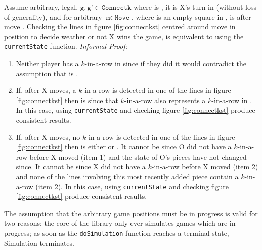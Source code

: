 Assume arbitrary, legal, $\texttt{g},\texttt{g'}\in\texttt{Connectk}$ where  is , it is X's turn in  (without loss of generality), and for arbitrary $\texttt{m}\in\texttt{Move}$, where  is an empty square in ,  is  after move . Checking the lines in figure \ref{fig:connectkst} centred around move  in position  to decide weather or not X wins the game, is equivalent to using the \texttt{currentState} function. \textit{Informal Proof:}
\begin{enumerate}
\item Neither player has a $k$-in-a-row in  since if they did it would contradict the assumption that  is .
\item If, after X moves, a $k$-in-a-row is detected in one of the lines in figure \ref{fig:connectkst} then  is  since that $k$-in-a-row also represents a $k$-in-a-row in . In this case, using \texttt{currentState} and checking figure \ref{fig:connectkst} produce consistent results.
\item If, after X moves, no $k$-in-a-row is detected in one of the lines in figure \ref{fig:connectkst} then  is either  or . It cannot be  since O did not have a $k$-in-a-row before X moved (item 1) and the state of O's pieces have not changed since. It cannot be  since X did not have a $k$-in-a-row before X moved (item 2) and none of the lines involving this most recently added piece contain a $k$-in-a-row (item 2). In this case, using \texttt{currentState} and checking figure \ref{fig:connectkst} produce consistent results.
\end{enumerate}
The assumption that the arbitrary game positions must be in progress is valid for two reasons: the core of the library only ever simulates games which are in progress; as soon as the \texttt{doSimulation} function reaches a terminal state, Simulation terminates.

